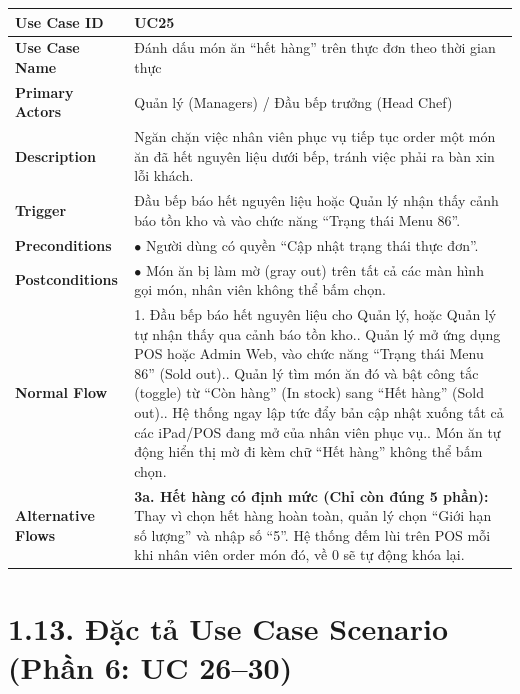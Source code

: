 \begin{longtable}{|L{3.5cm}|L{12.5cm}|}
\hline
\textbf{Use Case ID} & UC25 \\ \hline
\textbf{Use Case Name} & Đánh dấu món ăn ``hết hàng'' trên thực đơn theo thời gian thực \\ \hline
\textbf{Primary Actors} & Quản lý (Managers) / Đầu bếp trưởng (Head Chef) \\ \hline
\textbf{Description} & Ngăn chặn việc nhân viên phục vụ tiếp tục order một món ăn đã hết nguyên liệu dưới bếp, tránh việc phải ra bàn xin lỗi khách. \\ \hline
\textbf{Trigger} & Đầu bếp báo hết nguyên liệu hoặc Quản lý nhận thấy cảnh báo tồn kho và vào chức năng ``Trạng thái Menu 86''. \\ \hline
\textbf{Preconditions} & $\bullet$ Người dùng có quyền ``Cập nhật trạng thái thực đơn''. \\ \hline
\textbf{Postconditions} & $\bullet$ Món ăn bị làm mờ (gray out) trên tất cả các màn hình gọi món, nhân viên không thể bấm chọn. \\ \hline
\textbf{Normal Flow} &
1. Đầu bếp báo hết nguyên liệu cho Quản lý, hoặc Quản lý tự nhận thấy qua cảnh báo tồn kho.. Quản lý mở ứng dụng POS hoặc Admin Web, vào chức năng ``Trạng thái Menu 86'' (Sold out).. Quản lý tìm món ăn đó và bật công tắc (toggle) từ ``Còn hàng'' (In stock) sang ``Hết hàng'' (Sold out).. Hệ thống ngay lập tức đẩy bản cập nhật xuống tất cả các iPad/POS đang mở của nhân viên phục vụ.. Món ăn tự động hiển thị mờ đi kèm chữ ``Hết hàng'' không thể bấm chọn. \\ \hline
\textbf{Alternative Flows} &
\textbf{3a. Hết hàng có định mức (Chỉ còn đúng 5 phần):} Thay vì chọn hết hàng hoàn toàn, quản lý chọn ``Giới hạn số lượng'' và nhập số ``5''. Hệ thống đếm lùi trên POS mỗi khi nhân viên order món đó, về 0 sẽ tự động khóa lại. \\ \hline
\end{longtable}

\section*{1.13. Đặc tả Use Case Scenario (Phần 6: UC 26--30)}

